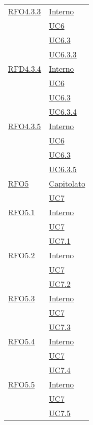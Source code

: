 \begin{longtable}{|>{\centering}m{5cm}|m{5cm}<{\centering}|}
\hyperlink{RFO4.3.3}{RFO4.3.3} 
& \hyperlink{Interno}{Interno}\\
& \hyperref[UC6]{UC6}\\
& \hyperref[UC6.3]{UC6.3}\\
& \hyperref[UC6.3.3]{UC6.3.3}\\ \hline

\hyperlink{RFD4.3.4}{RFD4.3.4} 
& \hyperlink{Interno}{Interno}\\
& \hyperref[UC6]{UC6}\\
& \hyperref[UC6.3]{UC6.3}\\
& \hyperref[UC6.3.4]{UC6.3.4}\\ \hline

\hyperlink{RFO4.3.5}{RFO4.3.5} 
& \hyperlink{Interno}{Interno}\\
& \hyperref[UC6]{UC6}\\
& \hyperref[UC6.3]{UC6.3}\\
& \hyperref[UC6.3.5]{UC6.3.5}\\ \hline

\hyperlink{RFO5}{RFO5} 
& \hyperlink{Capitolato}{Capitolato}\\
& \hyperref[UC7]{UC7}\\ \hline

\hyperlink{RFO5.1}{RFO5.1} 
& \hyperlink{Interno}{Interno}\\
& \hyperref[UC7]{UC7}\\
& \hyperref[UC7.1]{UC7.1}\\ \hline

\hyperlink{RFO5.2}{RFO5.2} 
& \hyperlink{Interno}{Interno}\\
& \hyperref[UC7]{UC7}\\
& \hyperref[UC7.2]{UC7.2}\\ \hline

\hyperlink{RFO5.3}{RFO5.3} 
& \hyperlink{Interno}{Interno}\\
& \hyperref[UC7]{UC7}\\
& \hyperref[UC7.3]{UC7.3}\\ \hline

\hyperlink{RFO5.4}{RFO5.4} 
& \hyperlink{Interno}{Interno}\\
& \hyperref[UC7]{UC7}\\
& \hyperref[UC7.4]{UC7.4}\\ \hline

\hyperlink{RFO5.5}{RFO5.5} 
& \hyperlink{Interno}{Interno}\\
& \hyperref[UC7]{UC7}\\
& \hyperref[UC7.5]{UC7.5}\\ \hline


\end{longtable}
